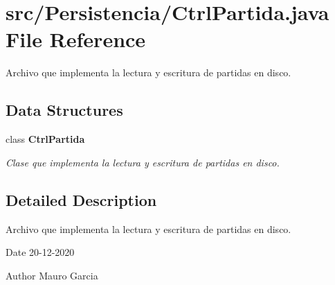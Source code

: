 \section{src/\+Persistencia/\+Ctrl\+Partida.java File Reference}
\label{_ctrl_partida_8java}


Archivo que implementa la lectura y escritura de partidas en disco.  


\subsection*{Data Structures}
\begin{DoxyCompactItemize}
\item 
class \textbf{ Ctrl\+Partida}
\begin{DoxyCompactList}\small\item\em Clase que implementa la lectura y escritura de partidas en disco. \end{DoxyCompactList}\end{DoxyCompactItemize}


\subsection{Detailed Description}
Archivo que implementa la lectura y escritura de partidas en disco. 

\begin{DoxyDate}{Date}
20-\/12-\/2020 
\end{DoxyDate}
\begin{DoxyAuthor}{Author}
Mauro Garcia 
\end{DoxyAuthor}
